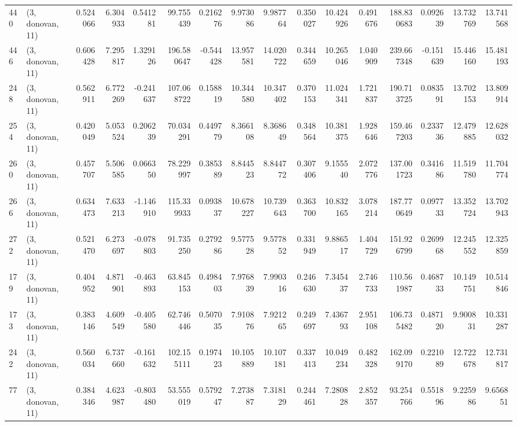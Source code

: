 \begin{tabular}{llrrrrrrrrrrrrrr}
440 &  (3, donovan, 11) &   0.524066 &   6.304933 &   0.541281 &    99.755439 &   0.216276 &   9.973086 &   9.987764 &  0.350027 &  10.424926 &   0.491676 &   188.830683 &  0.092639 &  13.732769 &  13.741568 \\
446 &  (3, donovan, 11) &   0.606428 &   7.295817 &   1.329126 &   196.580647 &  -0.544428 &  13.957581 &  14.020722 &  0.344659 &  10.265046 &   1.040909 &   239.667348 & -0.151639 &  15.446160 &  15.481193 \\
248 &  (3, donovan, 11) &   0.562911 &   6.772269 &  -0.241637 &   107.068722 &   0.158819 &  10.344580 &  10.347402 &  0.370153 &  11.024341 &   1.721837 &   190.713725 &  0.083591 &  13.702153 &  13.809914 \\
254 &  (3, donovan, 11) &   0.420049 &   5.053524 &   0.206239 &    70.034291 &   0.449779 &   8.366108 &   8.368649 &  0.348564 &  10.381375 &   1.928646 &   159.467203 &  0.233736 &  12.479885 &  12.628032 \\
260 &  (3, donovan, 11) &   0.457707 &   5.506585 &   0.066350 &    78.229997 &   0.385389 &   8.844523 &   8.844772 &  0.307406 &   9.155540 &   2.072776 &   137.001723 &  0.341686 &  11.519780 &  11.704774 \\
266 &  (3, donovan, 11) &   0.634473 &   7.633213 &  -1.146910 &   115.339933 &   0.093837 &  10.678227 &  10.739643 &  0.363700 &  10.832165 &   3.078214 &   187.770649 &  0.097733 &  13.352724 &  13.702943 \\
272 &  (3, donovan, 11) &   0.521470 &   6.273697 &  -0.078803 &    91.735250 &   0.279286 &   9.577528 &   9.577852 &  0.331949 &   9.886517 &   1.404729 &   151.926799 &  0.269968 &  12.245552 &  12.325859 \\
179 &  (3, donovan, 11) &   0.404952 &   4.871901 &  -0.463893 &    63.845153 &   0.498403 &   7.976839 &   7.990316 &  0.246630 &   7.345437 &   2.746733 &   110.561987 &  0.468733 &  10.149751 &  10.514846 \\
173 &  (3, donovan, 11) &   0.383146 &   4.609549 &  -0.405580 &    62.746446 &   0.507035 &   7.910876 &   7.921265 &  0.249697 &   7.436793 &   2.951108 &   106.735482 &  0.487120 &   9.900831 &  10.331287 \\
242 &  (3, donovan, 11) &   0.560034 &   6.737660 &  -0.161632 &   102.155111 &   0.197423 &  10.105889 &  10.107181 &  0.337413 &  10.049234 &   0.482328 &   162.099170 &  0.221089 &  12.722678 &  12.731817 \\
77  &  (3, donovan, 11) &   0.384346 &   4.623987 &  -0.803480 &    53.555019 &   0.579247 &   7.273887 &   7.318129 &  0.244461 &   7.280828 &   2.852357 &    93.254766 &  0.551896 &   9.225986 &   9.656851 \\

\end{tabular}
